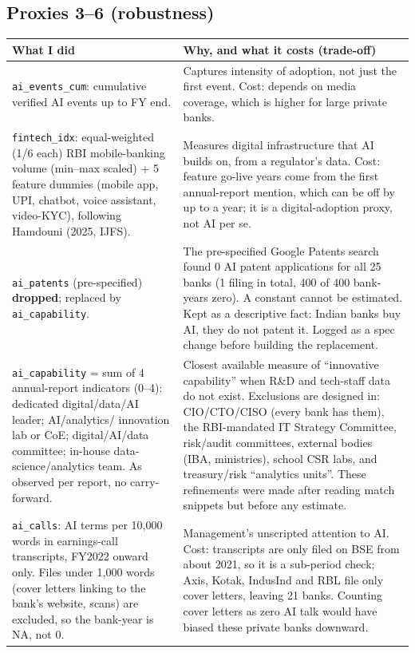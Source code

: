 \documentclass[10.5pt,a4paper]{article}
\newcommand{\var}[1]{\texttt{#1}}
\newenvironment{decisions}{%
  \begin{longtable}{L{0.36\textwidth} L{0.58\textwidth}}
  \toprule
  \textcolor{head}{\textbf{What I did}} & \textcolor{head}{\textbf{Why, and what it costs (trade-off)}}\\
  \midrule\endhead}{%
  \end{longtable}}
\newcommand{\row}[2]{#1 & #2\\ \midrule}
\begin{document}
\subsection*{Proxies 3--6 (robustness)}
\begin{decisions}
\row{\var{ai\_events\_cum}: cumulative verified AI events up to FY end.}
{Captures intensity of adoption, not just the first event. Cost: depends on media coverage, which is higher for large
private banks.}
\row{\var{fintech\_idx}: equal-weighted (1/6 each) RBI mobile-banking volume (min--max scaled) + 5 feature dummies
(mobile app, UPI, chatbot, voice assistant, video-KYC), following Hamdouni (2025, IJFS).}
{Measures digital infrastructure that AI builds on, from a regulator's data. Cost: feature go-live years come from the
first annual-report mention, which can be off by up to a year; it is a digital-adoption proxy, not AI per se.}
\row{\var{ai\_patents} (pre-specified) \textbf{dropped}; replaced by \var{ai\_capability}.}
{The pre-specified Google Patents search found 0 AI patent applications for all 25 banks (1 filing in total, 400 of 400
bank-years zero). A constant cannot be estimated. Kept as a descriptive fact: Indian banks buy AI, they do not patent
it. Logged as a spec change before building the replacement.}
\row{\var{ai\_capability} = sum of 4 annual-report indicators (0--4): dedicated digital/data/AI leader; AI/analytics/
innovation lab or CoE; digital/AI/data committee; in-house data-science/analytics team. As observed per report, no
carry-forward.}
{Closest available measure of ``innovative capability'' when R\&D and tech-staff data do not exist. Exclusions are
designed in: CIO/CTO/CISO (every bank has them), the RBI-mandated IT Strategy Committee, risk/audit committees,
external bodies (IBA, ministries), school CSR labs, and treasury/risk ``analytics units''. These refinements were made
after reading match snippets but before any estimate.}
\row{\var{ai\_calls}: AI terms per 10,000 words in earnings-call transcripts, FY2022 onward only. Files under
1,000 words (cover letters linking to the bank's website, scans) are excluded, so the bank-year is NA, not 0.}
{Management's unscripted attention to AI. Cost: transcripts are only filed on BSE from about 2021, so it is a
sub-period check; Axis, Kotak, IndusInd and RBL file only cover letters, leaving 21 banks. Counting cover letters as
zero AI talk would have biased these private banks downward.}
\end{decisions}
\end{document}
